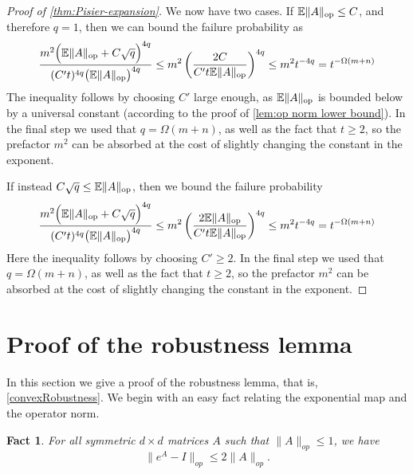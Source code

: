 \documentclass[aos]{imsart}
\newtheorem{fact}[theorem]{Fact}
\theoremstyle{definition}
\numberwithin{equation}{section}
\DeclareMathOperator{\op}{op}
\DeclarePairedDelimiter{\norm}{\lVert}{\rVert}
\newcommand{\E}{\mathbb{E}}
\begin{document}
\begin{appendix}
\begin{proof} [Proof of \cref{thm:Pisier-expansion}]
We now have two cases. If $\E \norm{A}_{\op} \leq C$, and therefore $q = 1$, then we can bound the failure probability as
\begin{align*}
  \frac{m^2 \Bigl( \E\norm A_{\op} + C \sqrt{q} \Bigr)^{4q}}{(C' t)^{4q} \bigl( \E \norm{A}_{\op} \bigr)^{4q}}
\leq
m^2 \left( \frac{2 C}{C' t \E\norm A_{\op}} \right)^{4q}
\leq m^2 t^{-4q}
= t^{-\Omega(m+n)}
\end{align*}
The inequality follows by choosing $C'$ large enough, as $\E\norm A_{\op}$ is bounded below by a universal constant (according to the proof of \cref{lem:op norm lower bound}). In the final step we used that $q = \Omega(m + n)$, as well as the fact that $t \geq 2$, so the prefactor $m^{2}$ can be absorbed at the cost of slightly changing the constant in the exponent.

If instead $C \sqrt{q} \leq \E \norm{A}_{\op}$, then we bound the failure probability
\begin{align*}
  \frac{m^2 \Bigl( \E\norm A_{\op} + C \sqrt{q} \Bigr)^{4q}}{(C' t)^{4q} \bigl( \E \norm{A}_{\op} \bigr)^{4q}}
\leq
m^2 \left( \frac{2 \E\norm A_{\op}}{C' t \E\norm A_{\op}} \right)^{4q}
\leq m^2 t^{-4q}
= t^{-\Omega(m+n)}
\end{align*}
Here the inequality follows by choosing $C' \geq 2$. In the final step we used that $q = \Omega(m + n)$, as well as the fact that $t \geq 2$, so the prefactor $m^{2}$ can be absorbed at the cost of slightly changing the constant in the exponent.
\end{proof}


\section{Proof of the robustness lemma}\label{app:robust}
In this section we give a proof of the robustness lemma, that is, \cref{convexRobustness}.
We begin with an easy fact relating the exponential map and the operator norm.

\begin{fact} \label{f:expTaylor} For all symmetric $d\times d$ matrices $A$ such that $ \|A\|_{op} \leq 1$, we have
$$ \|e^{A} - I\|_{op} \leq 2 \|A\|_{op}.$$
\end{fact}


\end{appendix}
\end{document}
